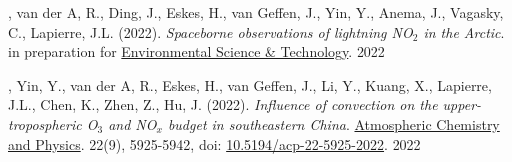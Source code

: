 \vspace{0.5em}

\begin{cvpublications}

\publication
{, van der A, R., Ding, J., Eskes, H., van Geffen, J.,
Yin, Y., Anema, J., Vagasky, C., Lapierre, J.L. (2022).
\emph{Spaceborne observations of lightning NO$_2$ in the Arctic}.
in preparation for \underline{Environmental Science \& Technology}.} %
{2022} %

\publication
{, Yin, Y., van der A, R., Eskes, H., van Geffen, J.,
Li, Y., Kuang, X., Lapierre, J.L., Chen, K., Zhen, Z., Hu, J. (2022).
\emph{Influence of convection on the upper-tropospheric O$_3$ and NO$_x$ budget in southeastern China}.
\underline{Atmospheric Chemistry and Physics}.
22(9), 5925-5942, doi: \href{https://doi.org/10.5194/acp-22-5925-2022}{10.5194/acp-22-5925-2022}.} %
{2022} %

\end{cvpublications}
